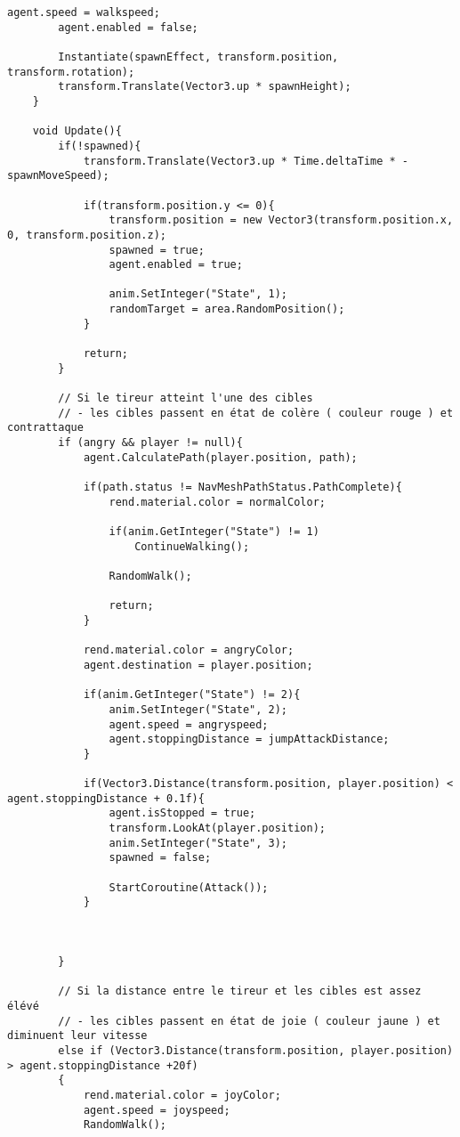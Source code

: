 \begin{lstlisting}[language=Csh]
		agent.speed = walkspeed;
		agent.enabled = false;
		
		Instantiate(spawnEffect, transform.position, transform.rotation);
		transform.Translate(Vector3.up * spawnHeight);
	}
	
	void Update(){
		if(!spawned){
			transform.Translate(Vector3.up * Time.deltaTime * -spawnMoveSpeed);
			
			if(transform.position.y <= 0){
				transform.position = new Vector3(transform.position.x, 0, transform.position.z);
				spawned = true;
				agent.enabled = true;
				
				anim.SetInteger("State", 1);
				randomTarget = area.RandomPosition();
			}
			
			return;
		}

        // Si le tireur atteint l'une des cibles
        // - les cibles passent en état de colère ( couleur rouge ) et contrattaque 
        if (angry && player != null){
			agent.CalculatePath(player.position, path);
			
			if(path.status != NavMeshPathStatus.PathComplete){	
				rend.material.color = normalColor;
				
				if(anim.GetInteger("State") != 1)
					ContinueWalking();
				
				RandomWalk();
				
				return;
			}

            rend.material.color = angryColor;
            agent.destination = player.position;
			
			if(anim.GetInteger("State") != 2){
				anim.SetInteger("State", 2);
                agent.speed = angryspeed;
                agent.stoppingDistance = jumpAttackDistance;
			}
			
			if(Vector3.Distance(transform.position, player.position) < agent.stoppingDistance + 0.1f){
				agent.isStopped = true;
				transform.LookAt(player.position);
				anim.SetInteger("State", 3);
				spawned = false;
				
				StartCoroutine(Attack());
			}


         
        }

        // Si la distance entre le tireur et les cibles est assez élévé
        // - les cibles passent en état de joie ( couleur jaune ) et diminuent leur vitesse
        else if (Vector3.Distance(transform.position, player.position) > agent.stoppingDistance +20f)
        {
            rend.material.color = joyColor;
            agent.speed = joyspeed;
            RandomWalk();


\end{lstlisting}
